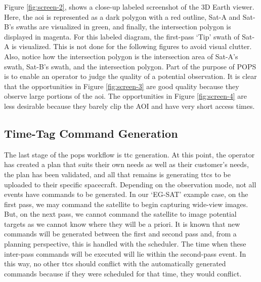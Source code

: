 %
%
%


Figure \ref{fig:screen-2}, shows a close-up labeled screenshot of the 3D Earth
viewer.  Here, the \gls{aoi} is represented as a dark polygon with a red
outline, Sat-A and Sat-B’s swaths are visualized in green, and finally, the
intersection polygon is displayed in magenta. For this labeled diagram, the
first-pass ‘Tip’ swath of Sat-A is visualized. This is not done for the
following figures to avoid visual clutter. Also, notice how the intersection
polygon is the intersection area of Sat-A’s swath, Sat-B’s swath, and the
intersection polygon. Part of the purpose of POPS is to enable an operator to
judge the quality of a potential observation. It is clear that the
opportunities in Figure \ref{fig:screen-3} are good quality because they
observe large portions of the \gls{aoi}. The opportunities in Figure
\ref{fig:screen-4} are less desirable because they barely clip the AOI and have
very short access times.


\subsection{Time-Tag Command Generation}

The last stage of the \gls{pops} workflow is \gls{ttc} generation.  At this
point, the operator has created a plan that suits their own needs as well as
their customer’s needs, the plan has been validated, and all that remains is
generating \glspl{ttc} to be uploaded to their specific spacecraft.  Depending
on the observation mode, not all events have commands to be generated. In our
‘EG-SAT’ example case, on the first pass, we may command the satellite to begin
capturing wide-view images. But, on the next pass, we cannot command the
satellite to image potential targets as we cannot know where they will be a
priori. It is known that new commands will be generated between the first and
second pass and, from a planning perspective, this is handled with the
scheduler. The time when these inter-pass commands will be executed will lie
within the second-pass event. In this way, no other \glspl{ttc} should conflict
with the automatically generated commands because if they were scheduled for
that time, they would conflict. 

